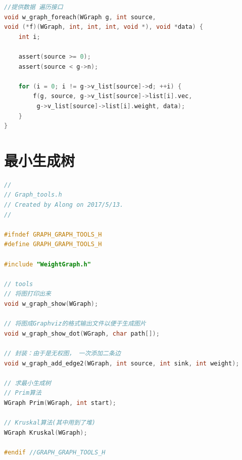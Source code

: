 \documentclass[a4paper,10pt]{ctexart}
\begin{document}
\begin{lstlisting}[language={C}]
//提供数据 遍历接口
void w_graph_foreach(WGraph g, int source,
void (*f)(WGraph, int, int, int, void *), void *data) {
    int i;

    assert(source >= 0);
    assert(source < g->n);

    for (i = 0; i != g->v_list[source]->d; ++i) {
        f(g, source, g->v_list[source]->list[i].vec,
         g->v_list[source]->list[i].weight, data);
    }
}
\end{lstlisting}
\section{最小生成树}
\begin{lstlisting}[language={C}]
//
// Graph_tools.h
// Created by Along on 2017/5/13.
//

#ifndef GRAPH_GRAPH_TOOLS_H
#define GRAPH_GRAPH_TOOLS_H

#include "WeightGraph.h"

// tools
// 将图打印出来
void w_graph_show(WGraph);

// 将图成Graphviz的格式输出文件以便于生成图片
void w_graph_show_dot(WGraph, char path[]);

// 封装：由于是无权图， 一次添加二条边
void w_graph_add_edge2(WGraph, int source, int sink, int weight);

// 求最小生成树
// Prim算法
WGraph Prim(WGraph, int start);

// Kruskal算法(其中用到了堆)
WGraph Kruskal(WGraph);

#endif //GRAPH_GRAPH_TOOLS_H
\end{lstlisting}
\end{document}
